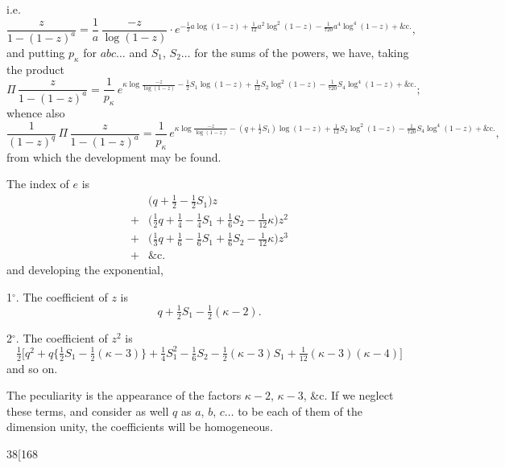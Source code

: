 \documentclass[11pt]{article}
\begin{document}
\medskip

\noindent i.e.
\[
\frac{z}{1 - (1 - z)^{a}} = \frac{1}{a}\,\frac{-z}{\log(1 - z)}\cdot e^{-\tfrac{1}{2} a\log(1-z) + \tfrac{1}{12} a^{2}\log^{2}(1-z) - \tfrac{1}{720} a^{4}\log^{4}(1-z) + \&\text{c.}},
\]
and putting $p_{\kappa}$ for $abc\ldots$ and $S_{1}$, $S_{2}\ldots$ for the sums of the powers, we have, taking the
product
\[
\Pi\,\frac{z}{1 - (1 - z)^{a}} = \frac{1}{p_{\kappa}}\,e^{\kappa \log\frac{-z}{\log(1 - z)} - \tfrac{1}{2} S_{1}\log(1-z) + \tfrac{1}{12} S_{2}\log^{2}(1-z) - \tfrac{1}{720} S_{4}\log^{4}(1-z) + \&\text{c.}};
\]
whence also
\[
\frac{1}{(1 - z)^{q}}\,\Pi\,\frac{z}{1 - (1 - z)^{a}} = \frac{1}{p_{\kappa}}\,e^{\kappa \log\frac{-z}{\log(1 - z)} - (q + \tfrac{1}{2} S_{1})\log(1-z) + \tfrac{1}{12} S_{2}\log^{2}(1-z) - \tfrac{1}{720} S_{4}\log^{4}(1-z) + \&\text{c.}},
\]
from which the development may be found.

The index of $e$ is
\begin{align*}
&\bigl(q + \tfrac{1}{2} - \tfrac{1}{2} S_{1}\bigr) z\\
+ &\bigl(\tfrac{1}{2} q + \tfrac{1}{4} - \tfrac{1}{4} S_{1} + \tfrac{1}{6} S_{2} - \tfrac{1}{12} \kappa\bigr) z^{2}\\
+ &\bigl(\tfrac{1}{3} q + \tfrac{1}{6} - \tfrac{1}{6} S_{1} + \tfrac{1}{6} S_{2} - \tfrac{1}{12} \kappa\bigr) z^{3}\\
+ &\&\text{c.}
\end{align*}
and developing the exponential,

1$^{\circ}$. The coefficient of $z$ is
\[
q + \tfrac{1}{2}S_{1} - \tfrac{1}{2}(\kappa - 2).
\]

2$^{\circ}$. The coefficient of $z^{2}$ is
\[
\tfrac{1}{2}\bigl[q^{2} + q\{\tfrac{1}{2}S_{1} - \tfrac{1}{2}(\kappa - 3)\} + \tfrac{1}{4}S_{1}^{2} - \tfrac{1}{6}S_{2} - \tfrac{1}{2}(\kappa - 3) S_{1} + \tfrac{1}{12}(\kappa - 3)(\kappa - 4)\bigr]
\]
and so on.

The peculiarity is the appearance of the factors $\kappa - 2$, $\kappa - 3$, \&c. If we neglect
these terms, and consider as well $q$ as $a$, $b$, $c\ldots$ to be each of them of the dimension
unity, the coefficients will be homogeneous.

\newpage

\begin{center}
\small\textsc{38}\hfill\hfill[168
\end{center}
\end{document}
